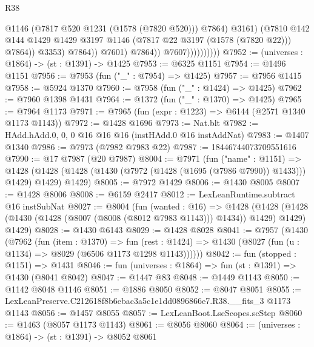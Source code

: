 \begin{lexlean}{R38}
\begin{coremodule}
                                          @1146
                                          (@7817 @520 @1231 (@1578 (@7820 @520)))
                                          @7864)
                                        @3161)
                                      (@7810
                                        @142
                                        @144
                                        @1429
                                        @1429
                                        @3197
                                        @1146
                                        (@7817 @22 @3197 (@1578 (@7820 @22)))
                                        @7864))
                                    @3353)
                                  @7864))
                              @7601)
                            @7864))
                        @7607))))))))))
@7952 := (universes : @1864) -> (st : @1391) -> @1425
@7953 := @6325 @1151
@7954 := @1496 @1151
@7956 := @7953 (fun ("_" : @7954) => @1425)
@7957 := @7956 @1415
@7958 := @5924 @1370
@7960 := @7958 (fun ("_" : @1424) => @1425)
@7962 := @7960 @1398 @1431
@7964 := @1372 (fun ("_" : @1370) => @1425)
@7965 := @7964 @1173
@7971 := @7965 (fun (expr : @1223) => @6144 (@2571 @1340 @1173 @1143))
@7972 := @1428 @1696
@7973 := Nat.blt
@7982 := HAdd.hAdd.{0, 0, 0} @16 @16 @16 (instHAdd.{0} @16 instAddNat)
@7983 := @1407 @1340
@7986 := @7973 (@7982 @7983 @22)
@7987 := 18446744073709551616
@7990 := @17 @7987 (@20 @7987)
@8004 := @7971
    (fun ("name" : @1151) =>
    @1428 (@1428 (@1428 (@1430 (@7972 (@1428 (@1695 (@7986 @7990)) @1433))) @1429) @1429) @1429)
@8005 := @7972 @1429
@8006 := @1430 @8005
@8007 := @1428 @8006
@8008 := @6159 @2417
@8012 := LexLeanRuntime.subtract @16 instSubNat
@8027 := @8004
    (fun (wanted : @16) =>
    @1428
      (@1428 (@1428 (@1430 (@1428 (@8007 (@8008 (@8012 @7983 @1143))) @1434)) @1429) @1429)
      @1429)
@8028 := @1430 @6143
@8029 := @1428 @8028
@8041 := @7957
    (@1430
      (@7962
        (fun (item : @1370) =>
        fun (rest : @1424) => @1430 (@8027 (fun (u : @1134) => @8029 (@6506 @1173 @1298 @1143))))))
@8042 := fun (stopped : @1151) => @1431
@8046 := fun (universes : @1864) => fun (st : @1391) => @1430 (@8041 @8042)
@8047 := @1447 @83
@8048 := @1449 @1143
@8050 := @1142 @8048 @1146
@8051 := @1886 @8050
@8052 := @8047 @8051
@8055 := LexLeanPreserve.C212618f8b6ebac3a5c1e1dd0896866e7.R38.__fits_3 @1173 @1143
@8056 := @1457 @8055
@8057 := LexLeanBoot.LseScopes.scStep
@8060 := @1463 (@8057 @1173 @1143)
@8061 := @8056 @8060
@8064 := (universes : @1864) -> (st : @1391) -> @8052 @8061

\end{coremodule}
\end{lexlean}
